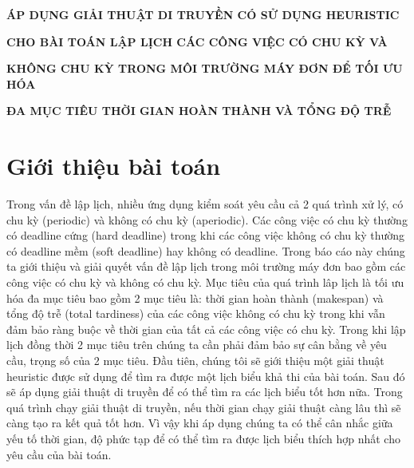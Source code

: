 \documentclass[a4paper,12pt]{article}
\begin{document}
\centerline{\textbf{\large{ÁP DỤNG GIẢI THUẬT DI TRUYỀN CÓ SỬ DỤNG HEURISTIC}}}
\centerline{\textbf{\large{CHO BÀI TOÁN LẬP LỊCH CÁC CÔNG VIỆC CÓ CHU KỲ VÀ}}}
\centerline{\textbf{\large{KHÔNG CHU KỲ TRONG MÔI TRƯỜNG MÁY ĐƠN ĐỂ TỐI ƯU HÓA}}}
\centerline{\textbf{\large{ĐA MỤC TIÊU THỜI GIAN HOÀN THÀNH VÀ TỔNG ĐỘ TRỄ}}}
\tableofcontents
\newpage
\section{Giới thiệu bài toán}
Trong vấn đề lập lịch, nhiều ứng dụng kiểm soát yêu cầu cả 2 quá trình xử lý, có chu kỳ (periodic) và không có chu kỳ (aperiodic). Các công việc có chu kỳ thường có deadline cứng (hard deadline) trong khi các công việc không có chu kỳ thường có deadline mềm (soft deadline) hay không có deadline. Trong báo cáo này chúng ta giới thiệu và giải quyết vấn đề lập lịch trong môi trường máy đơn bao gồm các công việc có chu kỳ và không có chu kỳ. Mục tiêu của quá trình lâp lịch là tối ưu hóa đa mục tiêu bao gồm 2 mục tiêu là: thời gian hoàn thành (makespan) và tổng độ trễ (total tardiness) của các công việc không có chu kỳ trong khi vẫn đảm bảo ràng buộc về thời gian của tất cả các công việc có chu kỳ. Trong khi lập lịch đồng thời 2 mục tiêu trên chúng ta cần phải đảm bảo sự cân bằng về yêu cầu, trọng số của 2 mục tiêu. Đầu tiên, chúng tôi sẽ giới thiệu một giải thuật heuristic được sử dụng để tìm ra được một lịch biểu khả thi của bài toán. Sau đó sẽ áp dụng giải thuật di truyền để có thể tìm ra các lịch biểu tốt hơn nữa. Trong quá trình chạy giải thuật di truyền, nếu thời gian chạy giải thuật càng lâu thì sẽ càng tạo ra kết quả tốt hơn. Vì vậy khi áp dụng chúng ta có thể cân nhắc giữa yếu tố thời gian, độ phức tạp để có thể tìm ra được lịch biểu thích hợp nhất cho yêu cầu của bài toán.
\end{document}
